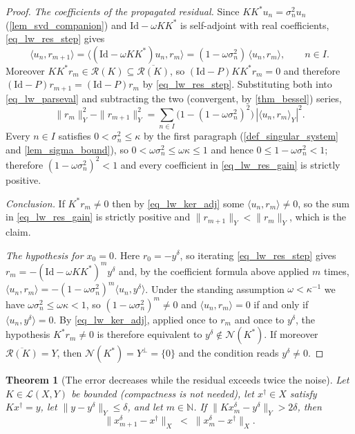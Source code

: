 \documentclass[a4paper]{report}
\theoremstyle{plain}
\newtheorem{theorem}{Theorem}[chapter]
\theoremstyle{definition}
\theoremstyle{remark}
\newcommand{\Ll}{\mathcal{L}}
\newcommand{\Ran}{\mathcal{R}}
\newcommand{\Ker}{\mathcal{N}}
\newcommand{\Id}{\mathrm{Id}}
\newcommand{\dg}{^{\dagger}}
\begin{document}
\begin{proof}
  \emph{The coefficients of the propagated residual.}  Since $KK^{*}u_n = \sigma_n^{2}u_n$
  (\cref{lem_svd_companion}) and $\Id - \omega KK^{*}$ is self-adjoint with real
  coefficients,
  \eqref{eq_lw_res_step} gives
  \[
    \langle u_n, r_{m+1}\rangle = \langle (\Id - \omega KK^{*})u_n, r_m\rangle
      = (1 - \omega\sigma_n^{2})\,\langle u_n, r_m\rangle ,
    \qquad n \in I .
  \]
  Moreover $KK^{*}r_m \in \Ran(K) \subseteq \overline{\Ran(K)}$, so
  $(\Id - P)KK^{*}r_m = 0$ and therefore $(\Id - P)r_{m+1} = (\Id - P)r_m$ by
  \eqref{eq_lw_res_step}.  Substituting both into \eqref{eq_lw_parseval} and subtracting
  the two (convergent, by \cref{thm_bessel}) series,
  \begin{equation}\label{eq_lw_res_gain}
    \|r_m\|_Y^{2} - \|r_{m+1}\|_Y^{2}
      = \sum_{n \in I}\bigl(1 - (1-\omega\sigma_n^{2})^{2}\bigr)\,
        |\langle u_n, r_m\rangle_Y|^{2} .
  \end{equation}
  Every $n \in I$ satisfies $0 < \sigma_n^{2} \le \kappa$ by the first
  paragraph (\cref{def_singular_system} and \cref{lem_sigma_bound}), so
  $0 < \omega\sigma_n^{2} \le \omega\kappa \le 1$ and hence
  $0 \le 1 - \omega\sigma_n^{2} < 1$; therefore $(1-\omega\sigma_n^{2})^{2} < 1$ and every
  coefficient in \eqref{eq_lw_res_gain} is strictly positive.

  \emph{Conclusion.}  If $K^{*}r_m \ne 0$ then by \eqref{eq_lw_ker_adj} some
  $\langle u_n, r_m\rangle \ne 0$, so the sum in \eqref{eq_lw_res_gain} is strictly
  positive and $\|r_{m+1}\|_Y < \|r_m\|_Y$, which is the claim.

  \emph{The hypothesis for $x_0 = 0$.}  Here $r_0 = -y^{\delta}$, so iterating
  \eqref{eq_lw_res_step} gives $r_m = -(\Id - \omega KK^{*})^{m}y^{\delta}$ and, by the
  coefficient formula above applied $m$ times,
  $\langle u_n, r_m\rangle = -(1-\omega\sigma_n^{2})^{m}\langle u_n, y^{\delta}\rangle$.
  Under the standing assumption $\omega < \kappa^{-1}$ we have
  $\omega\sigma_n^{2} \le \omega\kappa < 1$, so $(1-\omega\sigma_n^{2})^{m} \ne 0$ and
  $\langle u_n, r_m\rangle = 0$ if and only if $\langle u_n, y^{\delta}\rangle = 0$.  By
  \eqref{eq_lw_ker_adj}, applied once to $r_m$ and once to $y^{\delta}$, the hypothesis
  $K^{*}r_m \ne 0$ is therefore equivalent to $y^{\delta} \notin \Ker(K^{*})$.  If
  moreover $\overline{\Ran(K)} = Y$, then $\Ker(K^{*}) = Y^{\perp} = \{0\}$ and the
  condition reads $y^{\delta} \ne 0$.
\end{proof}


\begin{theorem}[The error decreases while the residual exceeds twice the noise]
  \label{thm_landweber_error_monotone}
  Let $K \in \Ll(X,Y)$ be bounded (compactness is not needed), let $x\dg \in X$ satisfy
  $Kx\dg = y$, let $\|y - y^{\delta}\|_Y \le \delta$, and let $m \in \mathbb{N}$.  If
  $\|Kx^{\delta}_m - y^{\delta}\|_Y > 2\delta$, then
  \[
    \|x^{\delta}_{m+1} - x\dg\|_X \;<\; \|x^{\delta}_m - x\dg\|_X .
  \]
\end{theorem}
\end{document}
